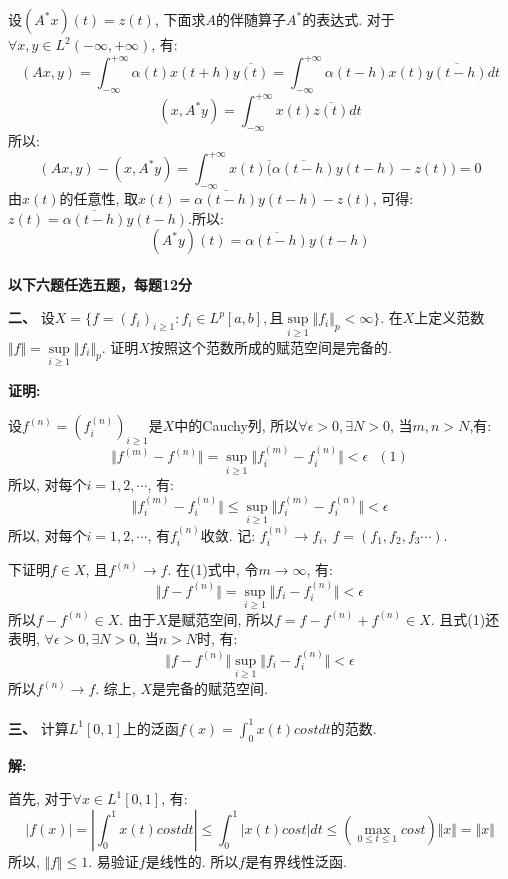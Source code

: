\documentclass{article}
\begin{document}
设$(A^*x)(t) = z(t)$, 下面求$A$的伴随算子$A^*$的表达式. 对于$\forall x, y \in L^2(-\infty, +\infty)$, 有:
$$ (Ax, y) = \int_{-\infty}^{+\infty} \alpha(t)x(t+h)\overline{y(t)} = \int_{-\infty}^{+\infty} \alpha(t-h)x(t)\overline{y(t-h)}dt $$
$$ (x, A^*y) = \int_{-\infty}^{+\infty} x(t)\overline{z(t)}dt $$
所以:
$$ (Ax, y) - (x, A^*y) = \int_{-\infty}^{+\infty} x(t)\overline(\overline{\alpha(t-h)}y(t-h) - z(t)) = 0 $$
由$x(t)$的任意性, 取$x(t) = \overline{\alpha(t-h)}y(t-h) - z(t)$, 可得: $z(t) = \overline{\alpha(t-h)}y(t-h)$.所以: 
$$  (A^*y)(t) = \overline{\alpha(t-h)}y(t-h) $$ \\

\textbf{以下六题任选五题，每题12分}

\textbf{二、} 设$X = \{f=(f_i)_{i \geq 1}: f_i \in L^p[a,b], \text{且} \sup\limits_{i \geq 1} \Vert{f_i}\Vert_p < \infty \}$. 在$X$上定义范数$\Vert{f} \Vert= \sup\limits_{i \geq 1} \Vert{f_i}\Vert_p$. 证明$X$按照这个范数所成的赋范空间是完备的.  

\textbf{证明:}

设$f^{(n)}= (f^{(n)}_i)_{i \geq 1} $是$X$中的Cauchy列, 所以$\forall \epsilon >0, \exists N>0$, 当$m,n > N$,有:
$$ \Vert f^{(m)} - f^{(n)} \Vert = \sup\limits_{i \geq 1}\Vert f^{(m)}_i - f^{(n)}_i \Vert < \epsilon \ \ \ (1)$$
所以, 对每个$i = 1, 2, \cdots$, 有:
$$ \Vert f^{(m)}_i - f^{(n)}_i\Vert \leq \sup\limits_{i \geq 1} \Vert f^{(m)}_i - f^{(n)}_i \Vert < \epsilon $$
所以, 对每个$i=1,2, \cdots$, 有$f^{(n)}_i$收敛. 记: $f^{(n)}_i \rightarrow f_i, \ f = (f_1, f_2, f_3 \cdots)$. 

下证明$f \in X$, 且$f^{(n)} \rightarrow f$. 在(1)式中, 令$m \rightarrow \infty$, 有:
$$ \Vert f - f^{(n)} \Vert = \sup\limits_{i \geq 1}\Vert f_i - f^{(n)}_i \Vert < \epsilon  $$ 
所以$f-f^{(n)} \in X$. 由于$X$是赋范空间, 所以$f = f-f^{(n)} + f^{(n)} \in X$. 且式(1)还表明, $\forall \epsilon >0, \exists N>0$, 当$n > N$时, 有:
$$  \Vert f - f^{(n)} \Vert \sup\limits_{i \geq 1}\Vert f_i - f^{(n)}_i \Vert < \epsilon $$
所以$f^{(n)} \rightarrow f$. 综上, $X$是完备的赋范空间. \\  \\



\textbf{三、} 计算$L^1[0,1]$上的泛函$f(x) = \int_0^1x(t)costdt$的范数. 

\textbf{解:}

首先, 对于$\forall x \in L^1[0,1]$, 有:
$$ |f(x)| = |\int_0^1 x(t)costdt| \leq \int_0^1 |x(t)cost| dt \leq (\max\limits_{0 \leq t \leq 1} cost) \Vert x \Vert = \Vert x \Vert  $$
所以, $\Vert f \Vert \leq 1$. 易验证$f$是线性的. 所以$f$是有界线性泛函.
\end{document}
